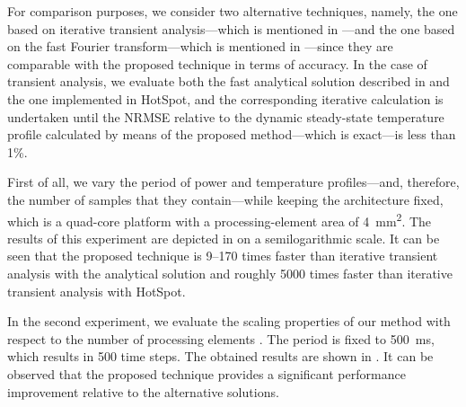 For comparison purposes, we consider two alternative techniques, namely, the one
based on iterative transient analysis---which is mentioned in
---and the one based on the fast Fourier
transform---which is mentioned in ---since
they are comparable with the proposed technique in terms of accuracy. In the
case of transient analysis, we evaluate both the fast analytical solution
described in  and the one implemented in HotSpot, and
the corresponding iterative calculation is undertaken until the \ac{NRMSE}
relative to the dynamic steady-state temperature profile calculated by means of
the proposed method---which is exact---is less than 1\%.

First of all, we vary the period \period of power and temperature
profiles---and, therefore, the number of samples \ns that they contain---while
keeping the architecture fixed, which is a quad-core platform with a
processing-element area of 4~mm\textsuperscript{2}. The results of this
experiment are depicted in  on a
semilogarithmic scale. It can be seen that the proposed technique is 9--170
times faster than iterative transient analysis with the analytical solution and
roughly 5000 times faster than iterative transient analysis with HotSpot.

In the second experiment, we evaluate the scaling properties of our method with
respect to the number of processing elements \np. The period is fixed to 500~ms,
which results in 500 time steps. The obtained results are shown in
. It can be observed that the
proposed technique provides a significant performance improvement relative to
the alternative solutions.

